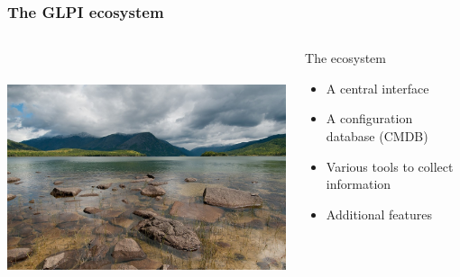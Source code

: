 \documentclass{beamer}
\begin{document}
\begin{frame}

    \frametitle{The GLPI ecosystem}

 \begin{columns}
 \begin{column}{0.45\textwidth}
         \includegraphics[height=7.5cm]{./pics/ecosystem.jpg}
 \end{column}
 \begin{column}{0.65\textwidth}
    \begin{block}{The ecosystem}
        \begin{itemize}
            \item A central interface 
            \item A configuration database (CMDB)
            \item Various tools to collect information 
            \item Additional features
        \end{itemize}
    \end{block}

 \end{column}
\end{columns}

\end{frame}
\end{document}
